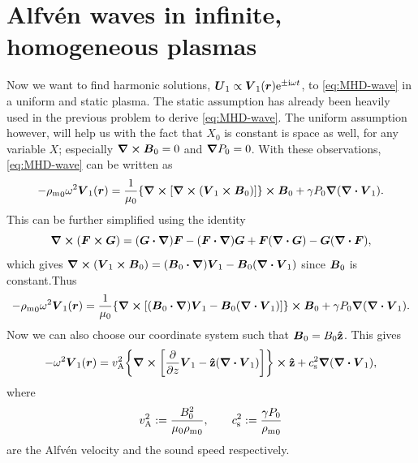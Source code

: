 \documentclass[11pt,a4paper, 
swedish, english %
]{article}
\newcommand{\rhom}{\ensuremath{{\rho_{\text{m}}}}}
\newcommand{\vA}{\ensuremath{v_{\text{A}}}}
\newcommand{\cs}{\ensuremath{c_{\text{s}}}}
\begin{document}
\section{Alfvén waves in infinite, homogeneous plasmas}
Now we want to find harmonic solutions,
$\vb*U_1\propto\vb*V_1(\vb*r)\mathrm{e}^{\pm\mathrm{i}\omega t}$, to
\eqref{eq:MHD-wave} in a uniform and static plasma. The static
assumption has already been heavily used in the previous problem to
derive \eqref{eq:MHD-wave}. The uniform assumption however, will help
us with the fact that $X_0$ is constant is space as well, for any
variable $X$; especially $\curl\vb*B_0=0$ and $\grad P_0=0$. With
these observations, \eqref{eq:MHD-wave} can be written as
\begin{equation}
-\rhom_0\omega^2\vb*V_1(\vb*r)
=\frac{1}{\mu_0}
\qty{\curl\qty[\curl\qty(\vb*V_1\cross\vb*B_0)]}\cross\vb*B_0
+\gamma P_0 \grad(\div\vb*V_1).
\end{equation}
This can be further simplified using the identity
\begin{equation}
\curl(\vb*F\cross\vb*G)
=(\vb*G\vdot\grad)\vb*F - (\vb*F\vdot\grad)\vb*G
+\vb*F(\div\vb*G) - \vb*G(\div\vb*F),
\end{equation}
which gives
$\curl(\vb*V_1\cross\vb*B_0)
=(\vb*B_0\vdot\grad)\vb*V_1 - \vb*B_0(\div\vb*V_1)$
since $\vb*B_0$ is constant.Thus
\begin{equation}
-\rhom_0\omega^2\vb*V_1(\vb*r)
=\frac{1}{\mu_0}
\qty{\curl\qty[(\vb*B_0\vdot\grad)\vb*V_1 
- \vb*B_0(\div\vb*V_1)]}\cross\vb*B_0
+\gamma P_0 \grad(\div\vb*V_1).
\end{equation}
Now we can also choose our coordinate system such that
$\vb*B_0=B_0\vu{z}$. This gives
\begin{equation}\label{eq4:MHD-wave_real}
-\omega^2\vb*V_1(\vb*r)
=\vA^2\qty{\curl\qty[\pdv{z}\vb*V_1 
- \vu{z}(\div\vb*V_1)]}\cross\vu{z}
+\cs^2 \grad(\div\vb*V_1),
\end{equation}
where
\begin{equation}
\vA^2:=\frac{B_0^2}{\mu_0\rhom_0}\qc\quad
\cs^2:=\frac{\gamma P_0}{\rhom_0}
\end{equation}
are the Alfvén velocity and the sound speed respectively.
\end{document}
